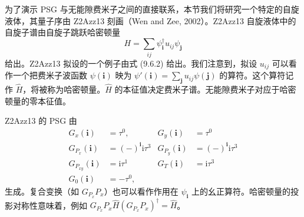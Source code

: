 为了演示 PSG 与无能隙费米子之间的直接联系，本节我们将研究一个特定的自旋液体，其量子序由 Z2Azz13 刻画（Wen and Zee, 2002）。Z2Azz13 自旋液体中的自旋子谱由自旋子跳跃哈密顿量
\begin{equation*}
H=\sum_{ij}\psi_{\pmb{i}}^{\dagger}u_{ij}\psi_{\pmb{j}}
\end{equation*}
给出。Z2Azz13 拟设的一个例子由式 (9.6.2) 给出。我们注意到，拟设 $u_{ij}$ 可以看作一个把费米子波函数 $\psi(\pmb{i})$ 映为 $\psi'(\pmb{i})=\sum_{\pmb{j}}u_{ij}\psi(\pmb{j})$ 的算符。这个算符记作 $\hat{H}$，将被称为哈密顿量。$\hat{H}$ 的本征值决定费米子谱。无能隙费米子对应于哈密顿量的零本征值。

Z2Azz13 的 PSG 由
\begin{align*}
G_{x}(\pmb{i}) &= \tau^{0}, & G_{y}(\pmb{i}) &= \tau^{0}\\
G_{P_{x}}(\pmb{i}) &= (-)^{\pmb{i}}\mathrm{i}\tau^{3} & G_{P_{y}}(\pmb{i}) &= (-)^{\pmb{i}}\mathrm{i}\tau^{3}\\
G_{P_{xy}}(\pmb{i}) &= \mathrm{i}\tau^{1} & G_{T}(\pmb{i}) &= \mathrm{i}\tau^{3}\\
G_{0}(\pmb{i}) &= -\tau^{0},\tag{9.10.1}
\end{align*}
生成。复合变换（如 $G_{P_{x}}P_{x}$）也可以看作作用在 $\psi_{\pmb{i}}$ 上的幺正算符。哈密顿量的投影对称性意味着，例如 $G_{P_{x}}P_{x}\hat{H}(G_{P_{x}}P_{x})^{\dagger}=\hat{H}$。

